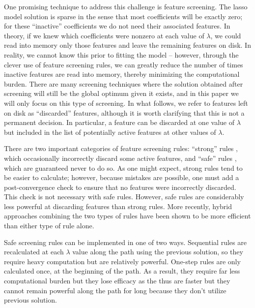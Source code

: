 One promising technique to address this challenge is feature screening. The lasso model solution is sparse in the sense that most coefficients will be exactly zero; for these ``inactive'' coefficients we do not need their associated features.  In theory, if we knew which coefficients were nonzero at each value of $\lambda$, we could read into memory only those features and leave the remaining features on disk. In reality, we cannot know this prior to fitting the model -- however, through the clever use of feature screening rules, we can greatly reduce the number of times inactive features are read into memory, thereby minimizing the computational burden. There are many screening techniques where the solution obtained after screening will still be the global optimum given it exists, and in this paper we will only focus on this type of screening. In what follows, we refer to features left on disk as ``discarded'' features, although it is worth clarifying that this is not a permanent decision.  In particular, a feature can be discarded at one value of $\lambda$ but included in the list of potentially active features at other values of $\lambda$.

There are two important categories of feature screening rules: ``strong'' rules \citep{tibshirani2011regression, qian2019fast}, which occasionally incorrectly discard some active features, and ``safe'' rules \citep{ghaoui2010safe,wang2013lasso,xiang2012fast, xiang2011learning}, which are guaranteed never to do so.  As one might expect, strong rules tend to be easier to calculate; however, because mistakes are possible, one must add a post-convergence check to ensure that no features were incorrectly discarded. This check is not necessary with safe rules. However, safe rules are considerably less powerful at discarding features than strong rules. More recently, hybrid approaches \citep{Zeng2021} combining the two types of rules have been shown to be more efficient than either type of rule alone.

Safe screening rules can be implemented in one of two ways. Sequential rules are recalculated at each $\lambda$ value along the path using the previous solution, so they require heavy computation but are relatively powerful. One-step rules are only calculated once, at the beginning of the path. As a result, they require far less computational burden but they lose efficacy as the thus are faster but they cannot remain powerful along the path for long because they don't utilize previous solution.

